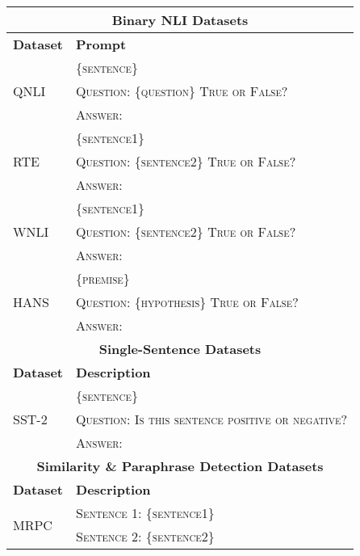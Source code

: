 \begin{table*}[h!]
\centering
\begin{tabular}{p{}p{}}
  \toprule
  \multicolumn{2}{c}{\textbf{Binary NLI Datasets}} \\
  \midrule
  \textbf{Dataset} & \textbf{Prompt} \\
  \midrule
  \multirow{3}{*}{QNLI \citep{wang-etal-2018-glue}} & \{\textsc{sentence}\}\\
  & \textsc{Question: } \{\textsc{question}\} \textsc{True or False?} \\
  & \textsc{Answer: } \\ 
  \midrule
  \multirow{3}{*}{RTE \tablefootnote{\citep{dagan2006pascal, bar2006second, giampiccolo2007third, bentivogli2009fifth}}} & \{\textsc{sentence1}\} \\
  & \textsc{Question: } \{\textsc{sentence2}\} \textsc{True or False?} \\
  & \textsc{Answer: } \\
  \midrule
  \multirow{3}{*}{WNLI \citep{levesque2011winograd}} & \{\textsc{sentence1}\} \\
  & \textsc{Question: } \{\textsc{sentence2}\} \textsc{True or False?} \\
  & \textsc{Answer: } \\
  \midrule
  \multirow{3}{*}{HANS \citep{DBLP:journals/corr/abs-1902-01007}} & \{\textsc{premise}\} \\
  & \textsc{Question: } \{\textsc{hypothesis}\} \textsc{True or False?} \\
  & \textsc{Answer: } \\
  \midrule
  \multicolumn{2}{c}{\textbf{Single-Sentence Datasets}} \\
  \midrule
  \textbf{Dataset} & \textbf{Description} \\
  \midrule
  \multirow{3}{*}{SST-2 \citep{socher2013recursive}} & \textsc{\{sentence\}} \\
  & \textsc{Question: Is this sentence positive or negative?} \\
  & \textsc{Answer: }\\
  \midrule
  \multicolumn{2}{c}{\textbf{Similarity \& Paraphrase Detection Datasets}} \\
  \midrule
  \textbf{Dataset} & \textbf{Description} \\
  \midrule
  \multirow{4}{*}{MRPC \citep{dolan2004unsupervised}} &
  \textsc{Sentence 1: \{sentence1\}} \\ 
  & \textsc{Sentence 2: \{sentence2\}} \\

\end{tabular}
\end{table*}
